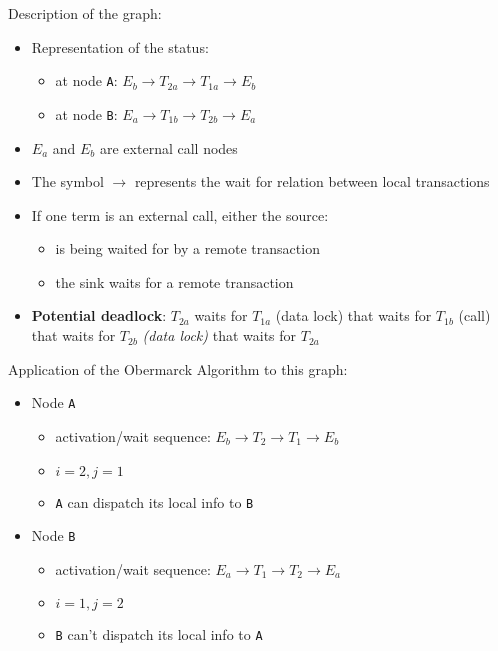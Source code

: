 \documentclass[english]{article}
\begin{document}
Description of the graph:
\begin{itemize}
  \item Representation of the status:
        \begin{itemize}
          \item at node \texttt{A}: \(E_b \rightarrow T_{2a} \rightarrow T_{1a} \rightarrow E_b\)
          \item at node \texttt{B}: \(E_a \rightarrow T_{1b} \rightarrow T_{2b} \rightarrow E_a\)
        \end{itemize}
  \item \(E_a\) and \(E_b\) are external call nodes
  \item The symbol \(\rightarrow\) represents the wait for relation between local transactions
  \item If one term is an external call, either the source:
        \begin{itemize}
          \item is being waited for by a remote transaction
          \item the sink waits for a remote transaction
        \end{itemize}
  \item \textbf{Potential deadlock}: \(T_{2a}\) waits for \(T_{1a}\) (data lock) that waits for \(T_{1b}\) (call) that waits for \(T_{2b}\) \textit{(data lock)} that waits for \(T_{2a}\)
\end{itemize}

Application of the Obermarck Algorithm to this graph:
\begin{itemize}
  \item Node \texttt{A}
        \begin{itemize}
          \item activation/wait sequence: \(E_b \rightarrow T_{2} \rightarrow T_{1} \rightarrow E_b\)
          \item \(i = 2, j = 1\)
          \item \texttt{A} can dispatch its local info to \texttt{B}
        \end{itemize}
  \item Node \texttt{B}
        \begin{itemize}
          \item activation/wait sequence: \(E_a \rightarrow T_{1} \rightarrow T_{2} \rightarrow E_a\)
          \item \(i = 1, j = 2\)
          \item \texttt{B} can't dispatch its local info to \texttt{A}
        \end{itemize}
\end{itemize}
\end{document}
